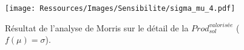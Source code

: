
\begin{figure}
    \centering
    \texttt{[image: Ressources/Images/Sensibilite/sigma\_mu\_4.pdf]}
    \caption[Résultat de l’analyse de Morris sur le détail de la
             $Prod_{sol}^{valorisée}$ ($f(\mu) = \sigma$)]
            {Résultat de l’analyse de Morris sur le détail de la
             $Prod_{sol}^{valorisée}$ ($f(\mu) = \sigma$).}
    \label{fig:prod_sol_valorisee_mu}
\end{figure}
